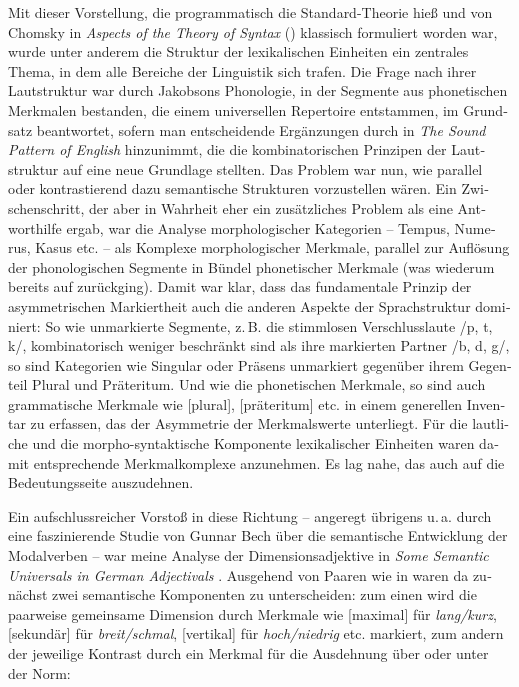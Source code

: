 \documentclass[output=paper,colorlinks,citecolor=brown]{langscibook}
\begin{document}
\begin{otherlanguage}{german}
Mit dieser Vorstellung, die programmatisch die \glqq Standard-Theorie\grqq{} hieß und von Chomsky in \textit{Aspects of the Theory of Syntax} (\citeyear{Chomsky1965}) klassisch formuliert worden war, wurde unter anderem die Struktur der lexikalischen Einheiten ein zentrales Thema, in dem alle Bereiche der Linguistik sich trafen. Die Frage nach ihrer Lautstruktur war durch Jakobsons Phonologie, in der Segmente aus phonetischen Merkmalen bestanden, die einem universellen Repertoire entstammen, im Grundsatz beantwortet, sofern man entscheidende Ergänzungen durch \citet{ChomskyHalle1968} in \textit{The Sound Pattern of English} hinzunimmt, die die kombinatorischen Prinzipen der Lautstruktur auf eine neue Grundlage stellten. Das Problem war nun, wie parallel oder kontrastierend dazu semantische Strukturen vorzustellen wären. Ein Zwischenschritt, der aber in Wahrheit eher ein zusätzliches Problem als eine Antworthilfe ergab, war die Analyse morphologischer Kategorien -- Tempus, Numerus, Kasus etc. -- als Komplexe morphologischer Merkmale, parallel zur Auflösung der phonologischen Segmente in Bündel phonetischer Merkmale (was wiederum bereits auf \citealt{Jakobson1932} zurückging). Damit war klar, dass das fundamentale Prinzip der asymmetrischen Markiertheit auch die anderen Aspekte der Sprachstruktur dominiert: So wie unmarkierte Segmente, z.\,B. die stimmlosen Verschlusslaute /p, t, k/, kombinatorisch weniger beschränkt sind als ihre markierten Partner /b, d, g/, so sind Kategorien wie Singular oder Präsens unmarkiert gegenüber ihrem Gegenteil Plural und Präteritum. Und wie die phonetischen Merkmale, so sind auch grammatische Merkmale wie [plural], [präteritum] etc. in einem generellen Inventar zu erfassen, das der Asymmetrie der Merkmalswerte unterliegt. Für die lautliche und die morpho-syntaktische Komponente lexikalischer Einheiten waren damit entsprechende Merkmalkomplexe anzunehmen. Es lag nahe, das auch auf die Bedeutungsseite auszudehnen.

Ein aufschlussreicher Vorstoß in diese Richtung -- angeregt übrigens u.\,a. durch eine faszinierende Studie von Gunnar Bech %
über die semantische Entwicklung der Modalverben \citep{Bech1951} %
-- war meine Analyse der Dimensions\-adjektive in \textit{Some Semantic Universals in German Adjectivals}  \citep{bi:Bierwisch1967}%
. Ausgehend von Paaren wie in  waren da zunächst zwei semantische Komponenten zu unterscheiden: zum einen wird die paarweise gemeinsame Dimension durch Merkmale wie [maximal] für \textit{lang/kurz}, [sekundär] für \textit{breit/schmal}, [vertikal] für \textit{hoch/niedrig} etc. markiert, zum andern der jeweilige Kontrast durch ein Merkmal für die Ausdehnung über oder unter der Norm:


\end{otherlanguage}
\end{document}
